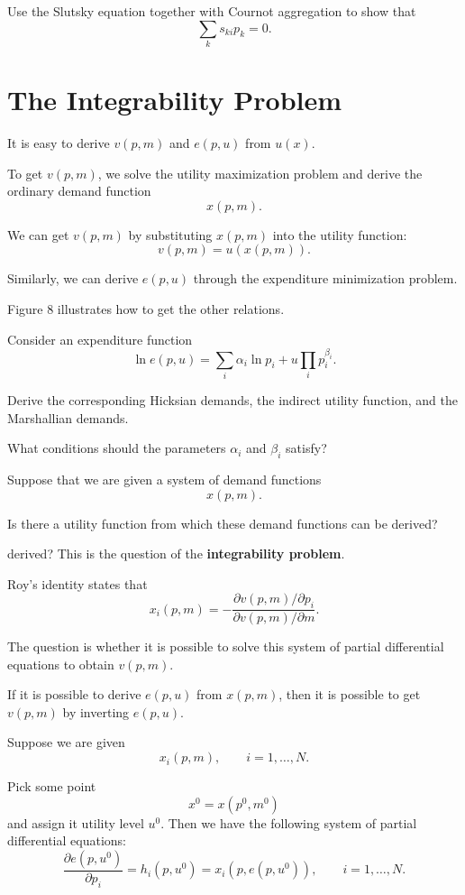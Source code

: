 \begin{exercise}
Use the Slutsky equation together with Cournot aggregation to show that
\[
\sum_k s_{ki}p_k=0.
\]
\end{exercise}

\section{The Integrability Problem}

It is easy to derive \(v(p,m)\) and \(e(p,u)\) from \(u(x)\).

To get \(v(p,m)\), we solve the utility maximization problem and derive the ordinary demand function
\[
x(p,m).
\]

We can get \(v(p,m)\) by substituting \(x(p,m)\) into the utility function:
\[
v(p,m)=u(x(p,m)).
\]

Similarly, we can derive \(e(p,u)\) through the expenditure minimization problem.

Figure 8 illustrates how to get the other relations.

\begin{exercise}
Consider an expenditure function
\[
\ln e(p,u)
=
\sum_i \alpha_i \ln p_i
+
u\prod_i p_i^{\beta_i}.
\]

Derive the corresponding Hicksian demands, the indirect utility function, and the Marshallian demands.

What conditions should the parameters \(\alpha_i\) and \(\beta_i\) satisfy?
\end{exercise}

Suppose that we are given a system of demand functions
\[
x(p,m).
\]

Is there a utility function from which these demand functions can be derived?



derived? This is the question of the \textbf{integrability problem}.

Roy's identity states that
\[
x_i(p,m)
=
-
\frac{
\partial v(p,m)/\partial p_i
}{
\partial v(p,m)/\partial m
}.
\]

The question is whether it is possible to solve this system of partial differential equations to obtain \(v(p,m)\).

If it is possible to derive \(e(p,u)\) from \(x(p,m)\), then it is possible to get \(v(p,m)\) by inverting \(e(p,u)\).

Suppose we are given
\[
x_i(p,m),
\qquad
i=1,\dots,N.
\]

Pick some point
\[
x^0=x(p^0,m^0)
\]
and assign it utility level \(u^0\). Then we have the following system of partial differential equations:
\[
\frac{\partial e(p,u^0)}{\partial p_i}
=
h_i(p,u^0)
=
x_i(p,e(p,u^0)),
\qquad
i=1,\dots,N.
\]


